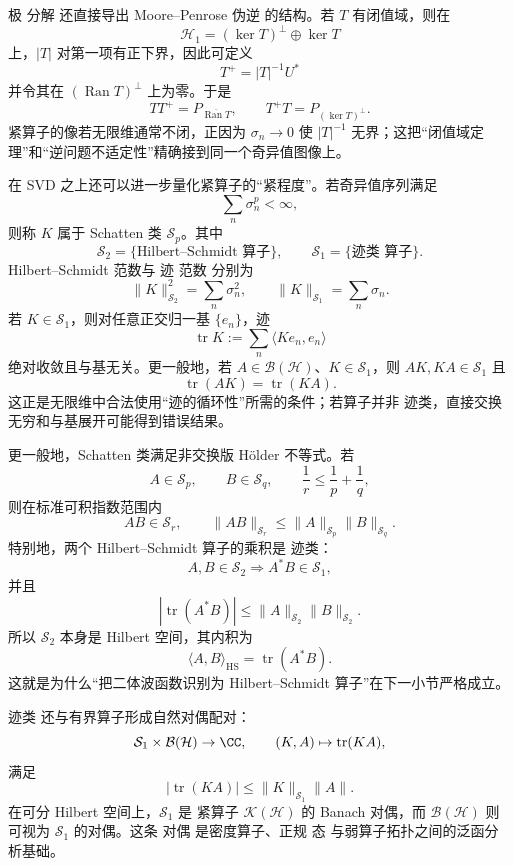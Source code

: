 极 分解 还直接导出 Moore--Penrose 伪逆 的结构。若 $T$ 有闭值域，则在
\[
\mathcal H_1=(\ker T)^\perp\oplus\ker T
\]
上，$|T|$ 对第一项有正下界，因此可定义
\[
T^+=|T|^{-1}U^*
\]
并令其在 $(\operatorname{Ran}T)^\perp$ 上为零。于是
\[
TT^+=P_{\overline{\operatorname{Ran}T}},
\qquad
T^+T=P_{(\ker T)^\perp}.
\]
紧算子的像若无限维通常不闭，正因为 $\sigma_n\to0$ 使 $|T|^{-1}$ 无界；这把“闭值域定理”和“逆问题不适定性”精确接到同一个奇异值图像上。

在 SVD 之上还可以进一步量化紧算子的``紧程度''。若奇异值序列满足
\[
\sum_n \sigma_n^p<\infty,
\]
则称 $K$ 属于 Schatten 类 $\mathcal S_p$。其中
\[
\mathcal S_2=\{\text{Hilbert--Schmidt 算子}\},
\qquad
\mathcal S_1=\{\text{迹类 算子}\}.
\]
Hilbert--Schmidt 范数与 迹 范数 分别为
\[
\|K\|_{\mathcal S_2}^2
=\sum_n\sigma_n^2,
\qquad
\|K\|_{\mathcal S_1}
=\sum_n\sigma_n.
\]
若 $K\in\mathcal S_1$，则对任意正交归一基 $\{e_n\}$，迹
\[
{
\operatorname{tr}K
:=\sum_n\langle Ke_n,e_n\rangle
}
\]
绝对收敛且与基无关。更一般地，若 $A\in\mathcal B(\mathcal H)$、$K\in\mathcal S_1$，则 $AK,KA\in\mathcal S_1$ 且
\[
\operatorname{tr}(AK)=\operatorname{tr}(KA).
\]
这正是无限维中合法使用``迹的循环性''所需的条件；若算子并非 迹类，直接交换无穷和与基展开可能得到错误结果。

更一般地，Schatten 类满足非交换版 H\"older 不等式。若
\[
A\in\mathcal S_p,
\qquad
B\in\mathcal S_q,
\qquad
\frac1r\le\frac1p+\frac1q,
\]
则在标准可积指数范围内
\[
AB\in\mathcal S_r,
\qquad
\|AB\|_{\mathcal S_r}
\le
\|A\|_{\mathcal S_p}\|B\|_{\mathcal S_q}.
\]
特别地，两个 Hilbert--Schmidt 算子的乘积是 迹类：
\[
A,B\in\mathcal S_2
\Longrightarrow
A^*B\in\mathcal S_1,
\]
并且
\[
|\operatorname{tr}(A^*B)|
\le
\|A\|_{\mathcal S_2}\|B\|_{\mathcal S_2}.
\]
所以 $\mathcal S_2$ 本身是 Hilbert 空间，其内积为
\begin{equation*}\langle A,B\rangle_{\mathrm{HS}}
=\operatorname{tr}(A^*B).\end{equation*}
这就是为什么“把二体波函数识别为 Hilbert--Schmidt 算子”在下一小节严格成立。

迹类 还与有界算子形成自然对偶配对：
\[
\mathcal S_1\times\mathcal B(\mathcal H)\to\CC,
\qquad
(K,A)\mapsto\operatorname{tr}(KA),
\]
满足
\[
|\operatorname{tr}(KA)|
\le\|K\|_{\mathcal S_1}\|A\|.
\]
在可分 Hilbert 空间上，$\mathcal S_1$ 是 紧算子 $\mathcal K(\mathcal H)$ 的 Banach 对偶，而 $\mathcal B(\mathcal H)$ 则可视为 $\mathcal S_1$ 的对偶。这条 对偶 是密度算子、正规 态 与弱算子拓扑之间的泛函分析基础。

